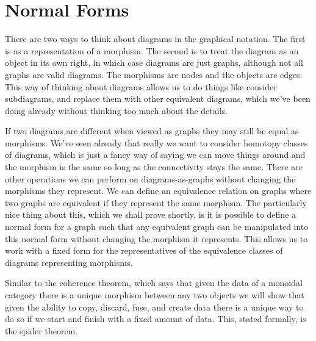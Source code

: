 \documentclass[fleqn]{NotesClass}
\begin{document}
    \chapter{Normal Forms}
    There are two ways to think about diagrams in the graphical notation.
    The first is as a representation of a morphism.
    The second is to treat the diagram as an object in its own right, in which case diagrams are just graphs, although not all graphs are valid diagrams.
    The morphisms are nodes and the objects are edges.
    This way of thinking about diagrams allows us to do things like consider subdiagrams, and replace them with other equivalent diagrams, which we've been doing already without thinking too much about the details.
    
    If two diagrams are different when viewed as graphs they may still be equal as morphisms.
    We've seen already that really we want to consider homotopy classes of diagrams, which is just a fancy way of saying we can move things around and the morphism is the same so long as the connectivity stays the same.
    There are other operations we can perform on diagrams-as-graphs without changing the morphisms they represent.
    We can define an equivalence relation on graphs where two graphs are equivalent if they represent the same morphism.
    The particularly nice thing about this, which we shall prove shortly, is it is possible to define a normal form for a graph such that any equivalent graph can be manipulated into this normal form without changing the morphism it represents.
    This allows us to work with a fixed form for the representatives of the equivalence classes of diagrams representing morphisms.
    
    Similar to the coherence theorem, which says that given the data of a monoidal category there is a unique morphism between any two objects we will show that given the ability to copy, discard, fuse, and create data there is a unique way to do so if we start and finish with a fixed amount of data.
    This, stated formally, is the spider theorem.
    
\end{document}
